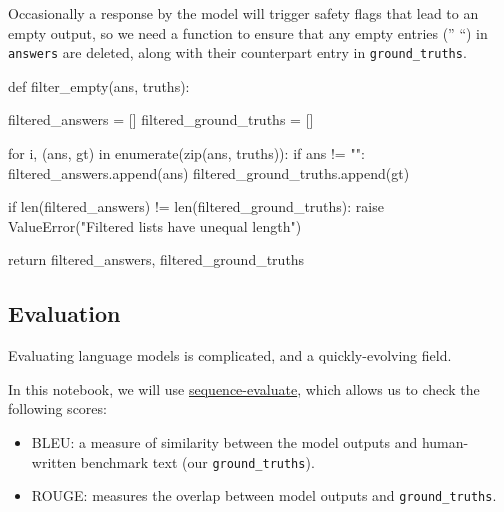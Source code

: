 \documentclass[
  letterpaper,
  DIV=11,
  numbers=noendperiod]{scrreprt}
\newenvironment{Shaded}{\begin{snugshade}}{\end{snugshade}}
\newcommand{\BuiltInTok}[1]{\textcolor[rgb]{0.00,0.23,0.31}{#1}}
\newcommand{\ControlFlowTok}[1]{\textcolor[rgb]{0.00,0.23,0.31}{#1}}
\newcommand{\KeywordTok}[1]{\textcolor[rgb]{0.00,0.23,0.31}{#1}}
\newcommand{\NormalTok}[1]{\textcolor[rgb]{0.00,0.23,0.31}{#1}}
\newcommand{\OperatorTok}[1]{\textcolor[rgb]{0.37,0.37,0.37}{#1}}
\newcommand{\PreprocessorTok}[1]{\textcolor[rgb]{0.68,0.00,0.00}{#1}}
\newcommand{\StringTok}[1]{\textcolor[rgb]{0.13,0.47,0.30}{#1}}
\begin{document}
Occasionally a response by the model will trigger safety flags that lead
to an empty output, so we need a function to ensure that any empty
entries ('' ``) in \texttt{answers} are deleted, along with their
counterpart entry in \texttt{ground\_truths}.

\begin{Shaded}
\begin{Highlighting}[]
\KeywordTok{def}\NormalTok{ filter\_empty(ans, truths):}

\NormalTok{  filtered\_answers }\OperatorTok{=}\NormalTok{ []}
\NormalTok{  filtered\_ground\_truths }\OperatorTok{=}\NormalTok{ []}

  \ControlFlowTok{for}\NormalTok{ i, (ans, gt) }\KeywordTok{in} \BuiltInTok{enumerate}\NormalTok{(}\BuiltInTok{zip}\NormalTok{(ans, truths)):}
    \ControlFlowTok{if}\NormalTok{ ans }\OperatorTok{!=} \StringTok{""}\NormalTok{:}
\NormalTok{      filtered\_answers.append(ans)}
\NormalTok{      filtered\_ground\_truths.append(gt)}

  \ControlFlowTok{if} \BuiltInTok{len}\NormalTok{(filtered\_answers) }\OperatorTok{!=} \BuiltInTok{len}\NormalTok{(filtered\_ground\_truths):}
    \ControlFlowTok{raise} \PreprocessorTok{ValueError}\NormalTok{(}\StringTok{"Filtered lists have unequal length"}\NormalTok{)}

  \ControlFlowTok{return}\NormalTok{ filtered\_answers, filtered\_ground\_truths}
\end{Highlighting}
\end{Shaded}

\hypertarget{evaluation-1}{%
\subsection{Evaluation}\label{evaluation-1}}

Evaluating language models is complicated, and a quickly-evolving field.

In this notebook, we will use
\href{https://pypi.org/project/sequence-evaluate/}{sequence-evaluate},
which allows us to check the following scores:

\begin{itemize}
\item
  BLEU: a measure of similarity between the model outputs and
  human-written benchmark text (our \texttt{ground\_truths}).
\item
  ROUGE: measures the overlap between model outputs and
  \texttt{ground\_truths}.
\end{itemize}
\end{document}
